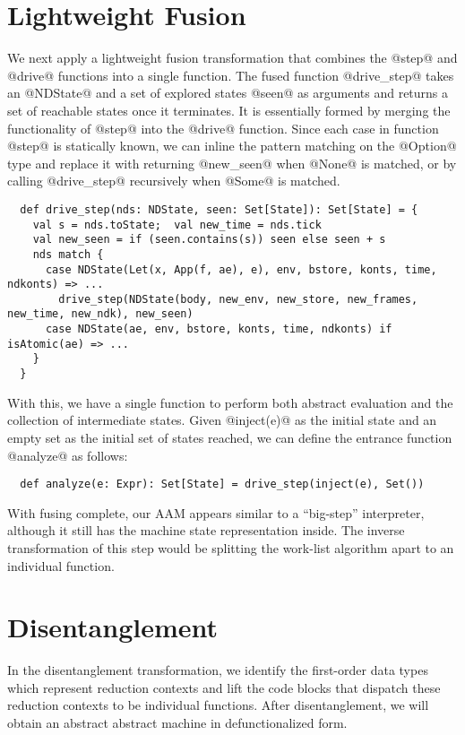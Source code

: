 \documentclass[acmsmall, screen]{acmart}\settopmatter{}
\begin{document}
\section{Lightweight Fusion} \label{fusing}

We next apply a lightweight fusion transformation that combines the @step@ and @drive@
functions into a single function.
The fused function @drive_step@ takes an @NDState@ and a set of explored states @seen@
as arguments and returns a set of reachable states once it terminates.
It is essentially formed by merging the functionality of @step@ into the @drive@ function.
Since each case in function @step@ is statically known, we can inline the pattern matching on the
@Option@ type and replace it with returning @new_seen@ when @None@ is matched, or by calling
@drive_step@ recursively when @Some@ is matched.

\begin{lstlisting}
  def drive_step(nds: NDState, seen: Set[State]): Set[State] = {
    val s = nds.toState;  val new_time = nds.tick
    val new_seen = if (seen.contains(s)) seen else seen + s
    nds match {
      case NDState(Let(x, App(f, ae), e), env, bstore, konts, time, ndkonts) => ...
        drive_step(NDState(body, new_env, new_store, new_frames, new_time, new_ndk), new_seen)
      case NDState(ae, env, bstore, konts, time, ndkonts) if isAtomic(ae) => ...
    }
  }
\end{lstlisting}

With this, we have a single function to perform both abstract evaluation and the collection of
intermediate states. Given @inject(e)@ as the initial state and an empty set as the
initial set of states reached, we can define the entrance function @analyze@ as follows:

\begin{lstlisting}
  def analyze(e: Expr): Set[State] = drive_step(inject(e), Set())
\end{lstlisting}

With fusing complete, our AAM appears similar to a ``big-step'' interpreter, although it
still has the machine state representation inside. The inverse transformation of this step
would be splitting the work-list algorithm apart to an individual function.

\section{Disentanglement} \label{disen}

In the disentanglement transformation, we identify the first-order data types which represent
reduction contexts and lift the code blocks that dispatch these reduction contexts to be individual
functions.
After disentanglement, we will obtain an abstract abstract machine in defunctionalized form.
\end{document}
